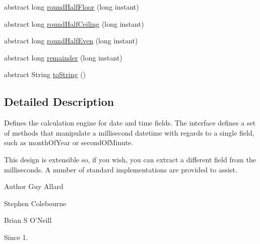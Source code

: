 \begin{DoxyCompactItemize}
abstract long \hyperlink{classorg_1_1joda_1_1time_1_1_date_time_field_a88fc9e6af1ab6c27f11046e382b3f398}{round\-Half\-Floor} (long instant)
\item 
abstract long \hyperlink{classorg_1_1joda_1_1time_1_1_date_time_field_a5b686d15e7aac079498463bb9035342f}{round\-Half\-Ceiling} (long instant)
\item 
abstract long \hyperlink{classorg_1_1joda_1_1time_1_1_date_time_field_a5ab46df274cb4b306d66a1f727187843}{round\-Half\-Even} (long instant)
\item 
abstract long \hyperlink{classorg_1_1joda_1_1time_1_1_date_time_field_adf44ebf245c4002df77b6852b05793f8}{remainder} (long instant)
\item 
abstract String \hyperlink{classorg_1_1joda_1_1time_1_1_date_time_field_a9d888721d7214b6953f3bb3cc4fa5583}{to\-String} ()
\end{DoxyCompactItemize}


\subsection{Detailed Description}
Defines the calculation engine for date and time fields. The interface defines a set of methods that manipulate a millisecond datetime with regards to a single field, such as month\-Of\-Year or second\-Of\-Minute. 

This design is extensible so, if you wish, you can extract a different field from the milliseconds. A number of standard implementations are provided to assist.

\begin{DoxyAuthor}{Author}
Guy Allard 

Stephen Colebourne 

Brian S O'Neill 
\end{DoxyAuthor}
\begin{DoxySince}{Since}
1. 
\end{DoxySince}


